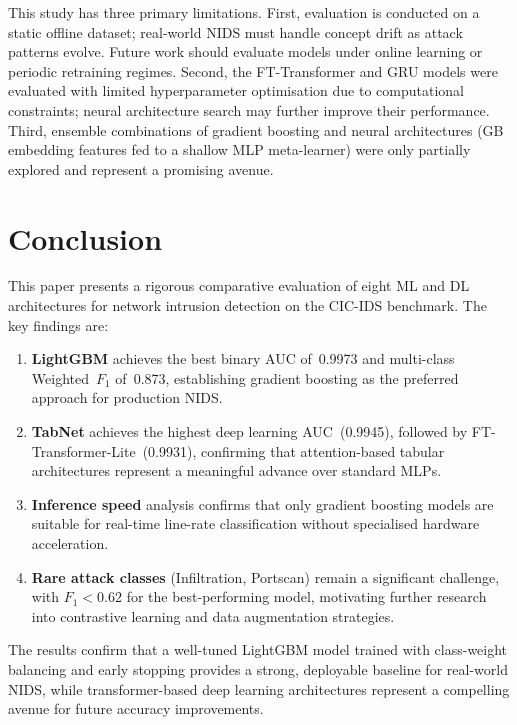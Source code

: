 \documentclass[conference]{IEEEtran}
\begin{document}
This study has three primary limitations.  First, evaluation is conducted on a
static offline dataset; real-world NIDS must handle concept drift as attack
patterns evolve.  Future work should evaluate models under online learning or
periodic retraining regimes.  Second, the FT-Transformer and GRU models were
evaluated with limited hyperparameter optimisation due to computational
constraints; neural architecture search may further improve their performance.
Third, ensemble combinations of gradient boosting and neural architectures
(GB embedding features fed to a shallow MLP meta-learner) were only partially
explored and represent a promising avenue.

\section{Conclusion}

This paper presents a rigorous comparative evaluation of eight ML and DL
architectures for network intrusion detection on the CIC-IDS benchmark.
The key findings are:

\begin{enumerate}[leftmargin=*,label=(\arabic*)]
  \item \textbf{LightGBM} achieves the best binary AUC of~0.9973 and
        multi-class Weighted~$F_1$ of~0.873, establishing gradient boosting
        as the preferred approach for production NIDS.
  \item \textbf{TabNet} achieves the highest deep learning AUC~(0.9945),
        followed by FT-Transformer-Lite~(0.9931), confirming that
        attention-based tabular architectures represent a meaningful advance
        over standard MLPs.
  \item \textbf{Inference speed} analysis confirms that only gradient boosting
        models are suitable for real-time line-rate classification without
        specialised hardware acceleration.
  \item \textbf{Rare attack classes} (Infiltration, Portscan) remain a
        significant challenge, with $F_1\!<\!0.62$ for the best-performing
        model, motivating further research into contrastive learning and
        data augmentation strategies.
\end{enumerate}

The results confirm that a well-tuned LightGBM model trained with
class-weight balancing and early stopping provides a strong, deployable
baseline for real-world NIDS, while transformer-based deep learning
architectures represent a compelling avenue for future accuracy improvements.
\end{document}
